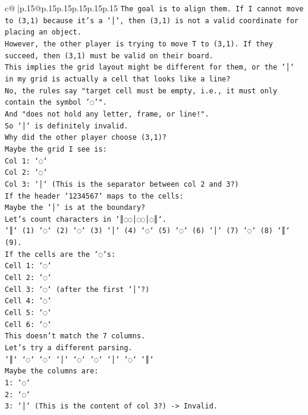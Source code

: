 \documentclass{article}
\begin{document}
{\begin{supertabular}{c@{$\;$}|p{.15\linewidth}@{}p{.15\linewidth}p{.15\linewidth}p{.15\linewidth}p{.15\linewidth}p{.15\linewidth}}
{{{\texttt{The goal is to align them. If I cannot move to (3,1) because it's a `│`, then (3,1) is not a valid coordinate for placing an object.} \\
\texttt{However, the other player is trying to move T to (3,1). If they succeed, then (3,1) must be valid on their board.} \\
\texttt{This implies the grid layout might be different for them, or the `│` in my grid is actually a cell that looks like a line?} \\
\texttt{No, the rules say "target cell must be empty, i.e., it must only contain the symbol '◌'".} \\
\texttt{And "does not hold any letter, frame, or line!".} \\
\texttt{So `│` is definitely invalid.} \\
\texttt{Why did the other player choose (3,1)?} \\
\texttt{Maybe the grid I see is:} \\
\texttt{Col 1: `◌`} \\
\texttt{Col 2: `◌`} \\
\texttt{Col 3: `│` (This is the separator between col 2 and 3?)} \\
\texttt{If the header `1234567` maps to the cells:} \\
\texttt{Maybe the `│` is at the boundary?} \\
\texttt{Let's count characters in `║◌◌│◌◌│◌║`.} \\
\texttt{`║` (1) `◌` (2) `◌` (3) `│` (4) `◌` (5) `◌` (6) `│` (7) `◌` (8) `║` (9).} \\
\texttt{If the cells are the `◌`s:} \\
\texttt{Cell 1: `◌`} \\
\texttt{Cell 2: `◌`} \\
\texttt{Cell 3: `◌` (after the first `│`?)} \\
\texttt{Cell 4: `◌`} \\
\texttt{Cell 5: `◌`} \\
\texttt{Cell 6: `◌`} \\
\texttt{This doesn't match the 7 columns.} \\
\texttt{Let's try a different parsing.} \\
\texttt{`║` `◌` `◌` `│` `◌` `◌` `│` `◌` `║`} \\
\texttt{Maybe the columns are:} \\
\texttt{1: `◌`} \\
\texttt{2: `◌`} \\
\texttt{3: `│` (This is the content of col 3?) {-}> Invalid.} \\
}}}
\end{supertabular}}
\end{document}
